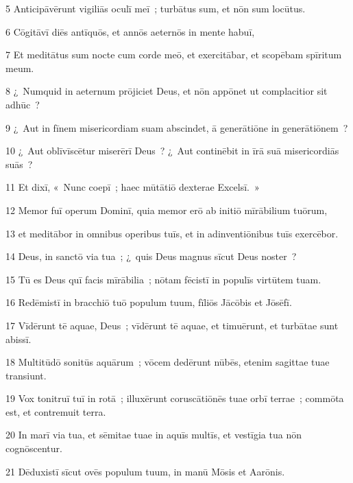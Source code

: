 \psalmVerse
  {\phantom{00}5}
  {Anticipāvērunt vigiliās oculī meī~; turbātus sum, et nōn sum locūtus.}


\psalmVerse
  {\phantom{00}6}
  {Cōgitāvī diēs antīquōs, et annōs aeternōs in mente habuī,}


\psalmVerse
  {\phantom{00}7}
  {Et meditātus sum nocte cum corde meō, et exercitābar, et scopēbam spīritum meum.}


\psalmVerse
  {\phantom{00}8}
  {¿~Numquid in aeternum prōjiciet Deus, et nōn appōnet ut complacitior sit adhūc~?}


\psalmVerse
  {\phantom{00}9}
  {¿~Aut in fīnem misericordiam suam abscindet, ā generātiōne in generātiōnem~?}


\psalmVerse
  {\phantom{0}10}
  {¿~Aut oblīvīscētur miserērī Deus~? ¿~Aut continēbit in īrā suā misericordiās suās~?}


\psalmVerse
  {\phantom{0}11}
  {Et dixī, «~Nunc coepī~; haec mūtātiō dexterae Excelsī.~»}


\psalmVerse
  {\phantom{0}12}
  {Memor fuī operum Dominī, quia memor erō ab initiō mīrābilium tuōrum,}


\psalmVerse
  {\phantom{0}13}
  {et meditābor in omnibus operibus tuīs, et in adinventiōnibus tuīs exercēbor.}


\psalmVerse
  {\phantom{0}14}
  {Deus, in sanctō via tua~; ¿~quis Deus magnus sīcut Deus noster~?}


\psalmVerse
  {\phantom{0}15}
  {Tū es Deus quī facis mīrābilia~; nōtam fēcistī in populīs virtūtem tuam.}


\psalmVerse
  {\phantom{0}16}
  {Redēmistī in bracchiō tuō populum tuum, fīliōs Jācōbis et Jōsēfī.}


\psalmVerse
  {\phantom{0}17}
  {Vīdērunt tē aquae, Deus~; vīdērunt tē aquae, et timuērunt, et turbātae sunt abissī.}


\psalmVerse
  {\phantom{0}18}
  {Multitūdō sonitūs aquārum~; vōcem dedērunt nūbēs, etenim sagittae tuae transiunt.}


\psalmVerse
  {\phantom{0}19}
  {Vox tonitruī tuī in rotā~; illuxērunt coruscātiōnēs tuae orbī terrae~; commōta est, et contremuit terra.}


\psalmVerse
  {\phantom{0}20}
  {In marī via tua, et sēmitae tuae in aquīs multīs, et vestīgia tua nōn cognōscentur.}


\psalmVerse
  {\phantom{0}21}
  {Dēduxistī sīcut ovēs populum tuum, in manū Mōsis et Aarōnis.}



